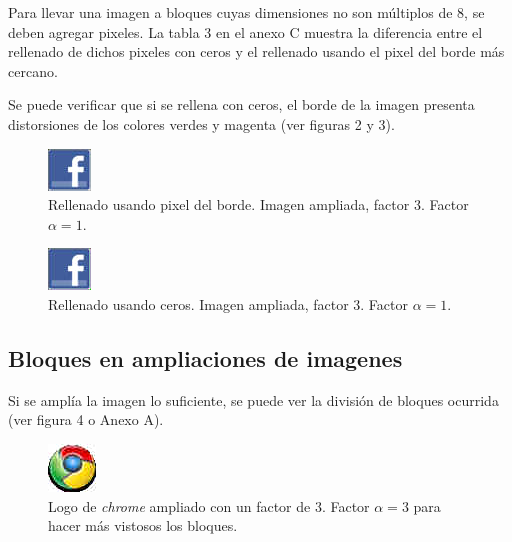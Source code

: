 \documentclass[%
	final,
	reprint,
	notitlepage,
	narroweqnarray,
	inline,
	twoside,
	invited
	]{ieee}
\begin{document}
Para llevar una imagen a bloques cuyas dimensiones no son múltiplos de 8, se deben agregar pixeles. La 
tabla 3 en el anexo C muestra la diferencia entre el rellenado de dichos pixeles con ceros y el rellenado usando 
el pixel del borde más cercano.


\par Se puede verificar que si se rellena con ceros, el borde de la imagen presenta distorsiones de los 
colores verdes y magenta (ver figuras 2 y 3).

\begin{figure}[H]
\centering
	\includegraphics[scale=3]{./img/facebookout.png}
	\caption{Rellenado usando pixel del borde. Imagen ampliada, factor 3. Factor $\alpha=1$.}
\label{lenna128}
\end{figure}

\begin{figure}[H]
\centering
	\includegraphics[scale=3]{./img/facebookout0.png}
	\caption{Rellenado usando ceros. Imagen ampliada, factor 3. Factor $\alpha=1$.}
\label{lenna128}
\end{figure}

\subsection{Bloques en ampliaciones de imagenes}

Si se amplía la imagen lo suficiente, se puede ver la división de bloques ocurrida (ver figura 4 o Anexo A).

\begin{figure}[H]
\centering
	\includegraphics[scale=3]{./img/chrome3out.png}
	\caption{Logo de \textit{chrome} ampliado con un factor de 3. Factor $\alpha=3$ para hacer más vistosos los bloques.}
\label{lenna128}
\end{figure}



\vspace{0.4cm}
\end{document}

